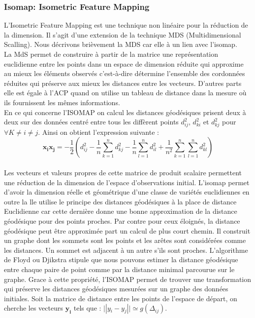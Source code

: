 \documentclass[twoside,twocolumn]{article}
\begin{document}
\subsubsection{Isomap: Isometric Feature Mapping}
L’Isometric Feature Mapping est une technique non linéaire pour la réduction de la dimension. Il s’agit d’une extension de la technique MDS (Multidimensional Scalling).  Nous décrivons brièvement la MDS car elle à un lien avec l'isomap. \\ 
La MdS permet de construire à partir de la matrice une représentation euclidienne entre les points dans un espace de dimension réduite qui approxime au mieux les éléments observés c'est-à-dire détermine l’ensemble des cordonnées réduites qui préserve aux mieux les distances entre les vecteurs. D’autres parts elle est égale à l'ACP quand on utilise un tableau de distance dans la mesure où ils fournissent les mêmes informations. \\ 
En ce qui concerne l’ISOMAP on calcul les distances géodésiques prisent deux à deux sur des données centré entre tous les diffèrent points $d^2_{ij}$, $d^2_{ki}$ et $d^2_{kj}$ pour $\forall  K \ne i \ne j$. Ainsi on obtient l’expression suivante \cite{Arias06}: 
\[\mathbf {x_i x_j}= -\dfrac{1}{2}( d^2_{ij}-\dfrac{1}{n} \sum_{k=1}^{n} d^2_{kj}-\dfrac{1}{n} \sum_{l=1}^{n} d^2_{il} + \dfrac{1}{n^2} \sum_{k=1}^{n} \sum_{l=1}^{n}  d^2_{kl}) \] \\
Les vecteurs et valeurs propres de cette matrice de produit scalaire permettent une réduction de la dimension de l’espace d’observations initial. 
L’isomap permet d’avoir la dimension réelle et géométrique d’une classe de variétés euclidiennes en outre la lle utilise le principe des distances géodésiques à la place de distance Euclidienne car cette dernière donne une bonne approximation de la distance géodésique pour des points proches. Par contre pour ceux éloignés, la distance géodésique peut être approximée part un calcul de plus court chemin. Il construit un graphe dont les sommets sont les points et les arêtes sont considérées comme les distances. Un sommet est adjacent à un autre s’ils sont proches.\cite{Cayton05}
L’algorithme de Floyd ou Djikstra stipule que nous pouvons estimer la distance géodésique entre chaque paire de point comme par la distance minimal parcourue sur le graphe. Grace à cette propriété, l’ISOMAP permet de trouver une transformation qui préserve les distances géodésiques mesurées sur un graphe des données initiales.
Soit la matrice de distance entre les points de l’espace de départ, on cherche les vecteurs $ \mathbf{ y_i}$ tels que \cite{Arias06}: $ \mathbf ||y{_i} - y{_j}|| \simeq g({\Delta _{ij}})$.\\
 
\end{document}
